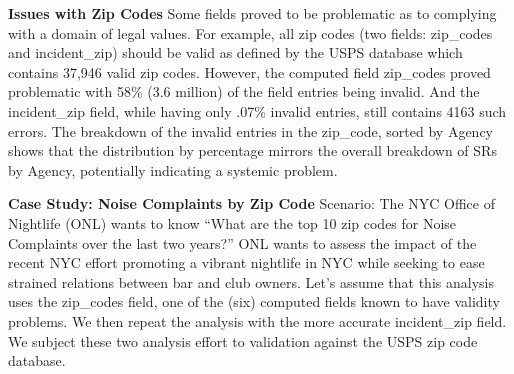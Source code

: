 \documentclass[12pt, titlepage]{article}
\begin{document}
\label{sec:zipcodesissues}
 \textbf{Issues with Zip Codes} Some fields proved to be problematic 
 as to complying with a domain of legal values. For example, all zip codes 
 (two fields: zip\_codes and incident\_zip) should be valid as defined 
 by the USPS database which contains 37,946 valid zip codes. However,
 the computed field zip\_codes proved problematic with 
58\% (3.6 million) of the field entries being invalid. And the 
incident\_zip field, while having only .07\% invalid entries, still contains
4163 such errors. The breakdown of the invalid entries in the zip\_code, sorted by 
Agency shows that the distribution by percentage mirrors the overall 
breakdown of SRs by Agency, potentially indicating a systemic problem.
	
\label{sec:case-study-zip-codes}
\textbf{Case Study: Noise Complaints by Zip Code} Scenario: The NYC 
Office of Nightlife (ONL) wants to know ``What are the top 10 
zip codes for Noise Complaints over the last two years?'' ONL wants
to assess the impact of the recent NYC effort promoting a vibrant nightlife 
in NYC while seeking to ease strained relations between bar 
and club owners. Let's assume that this analysis 
uses the zip\_codes field, one of the (six) computed fields known to 
have validity problems. We then repeat the analysis with the more 
accurate incident\_zip field. We subject these two analysis effort 
to validation against the USPS zip code database.
\end{document}
